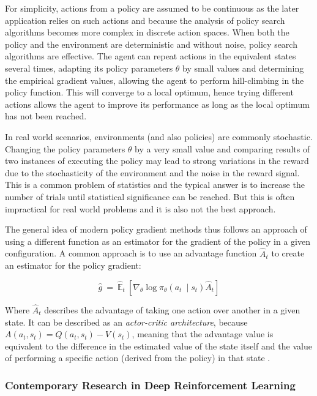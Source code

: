For simplicity, actions from a policy are assumed to be continuous as the later application relies on
such actions and because the analysis of policy search algorithms becomes more complex in discrete action spaces. When
both the policy and the environment are deterministic and without noise, policy search algorithms are effective.
The agent can repeat actions in the equivalent states several times, adapting its policy parameters $\theta$ by small
values and determining the empirical gradient values, allowing the agent to perform hill-climbing in the policy
function. This will converge to a local optimum, hence trying different actions allows the agent to improve its
performance as long as the local optimum has not been reached.

In real world scenarios, environments (and also policies) are commonly stochastic. Changing the policy
parameters $\theta$ by a very small value and comparing results of two instances of executing the policy may lead to
strong variations in the reward due to the stochasticity of the environment and the noise in the reward
signal. This is a common problem of statistics and the typical answer is to increase the number of trials until
statistical significance can be reached. But this is often impractical for real world problems and it is also not the
best approach.

The general idea of modern policy gradient methods thus follows an approach of using a different function as an
estimator for the gradient of the policy in a given configuration. A common approach is to use an advantage function
$\hat{A}_t$ to create an estimator for the policy gradient:


\begin{equation}
    \hat{g} \ =\ \hat{\mathbb{E}}_{t} \ \left[ \nabla _{\theta }\log \pi _{\theta }( a_{t} \ \mid s_{t})\hat{A}_{t}  \right]
\end{equation}

Where $\hat{A}_t$ describes the advantage of taking one action over another in a given state. It can be
described as an \emph{actor-critic architecture}, because $A(a_t, s_t) = Q(a_t,s_t) - V(s_t)$, meaning that the
advantage value is equivalent to the difference in the estimated value of the state itself and the value of performing
a specific action (derived from the policy) in that state \citep{mnih2016asynchronous}.

\subsubsection{Contemporary Research in Deep Reinforcement Learning}%
\label{sub:deep_learning_in_reinforcement_settings}

